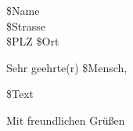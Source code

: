\documentclass[DIN, pagenumber=false, parskip=half, fromlogo=true, fromrule=true]{scrlttr2}
\begin{document}
 
\begin{letter}{\$Name \\ \$Strasse \\ \$PLZ \$Ort}
\opening{Sehr geehrte(r) \$Mensch,}
\$Text
\closing{Mit freundlichen Grüßen}
\end{letter}
 
\end{document}
